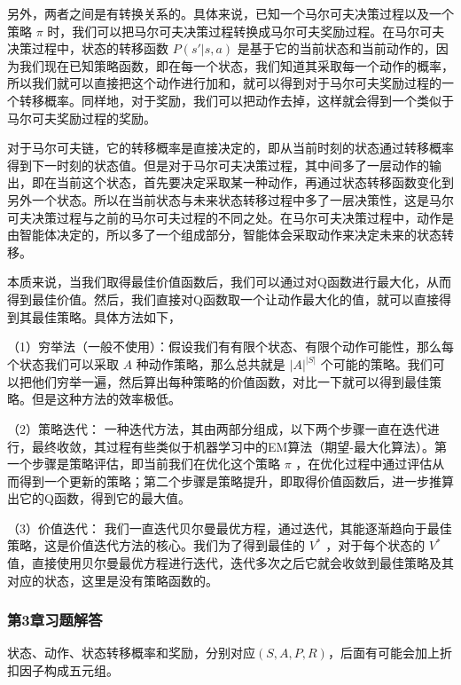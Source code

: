 另外，两者之间是有转换关系的。具体来说，已知一个马尔可夫决策过程以及一个策略 $\pi$ 时，我们可以把马尔可夫决策过程转换成马尔可夫奖励过程。在马尔可夫决策过程中，状态的转移函数 $P(s'|s,a)$ 是基于它的当前状态和当前动作的，因为我们现在已知策略函数，即在每一个状态，我们知道其采取每一个动作的概率，所以我们就可以直接把这个动作进行加和，就可以得到对于马尔可夫奖励过程的一个转移概率。同样地，对于奖励，我们可以把动作去掉，这样就会得到一个类似于马尔可夫奖励过程的奖励。

  
对于马尔可夫链，它的转移概率是直接决定的，即从当前时刻的状态通过转移概率得到下一时刻的状态值。但是对于马尔可夫决策过程，其中间多了一层动作的输出，即在当前这个状态，首先要决定采取某一种动作，再通过状态转移函数变化到另外一个状态。所以在当前状态与未来状态转移过程中多了一层决策性，这是马尔可夫决策过程与之前的马尔可夫过程的不同之处。在马尔可夫决策过程中，动作是由智能体决定的，所以多了一个组成部分，智能体会采取动作来决定未来的状态转移。

  
本质来说，当我们取得最佳价值函数后，我们可以通过对Q函数进行最大化，从而得到最佳价值。然后，我们直接对Q函数取一个让动作最大化的值，就可以直接得到其最佳策略。具体方法如下，

（1）穷举法（一般不使用）：假设我们有有限个状态、有限个动作可能性，那么每个状态我们可以采取 $A$ 种动作策略，那么总共就是 $|A|^{|S|}$ 个可能的策略。我们可以把他们穷举一遍，然后算出每种策略的价值函数，对比一下就可以得到最佳策略。但是这种方法的效率极低。

（2）策略迭代： 一种迭代方法，其由两部分组成，以下两个步骤一直在迭代进行，最终收敛，其过程有些类似于机器学习中的EM算法（期望-最大化算法）。第一个步骤是策略评估，即当前我们在优化这个策略 $\pi$ ，在优化过程中通过评估从而得到一个更新的策略；第二个步骤是策略提升，即取得价值函数后，进一步推算出它的Q函数，得到它的最大值。

（3）价值迭代： 我们一直迭代贝尔曼最优方程，通过迭代，其能逐渐趋向于最佳策略，这是价值迭代方法的核心。我们为了得到最佳的 $V^*$ ，对于每个状态的 $V^*$ 值，直接使用贝尔曼最优方程进行迭代，迭代多次之后它就会收敛到最佳策略及其对应的状态，这里是没有策略函数的。



\subsubsection*{第3章习题解答}


状态、动作、状态转移概率和奖励，分别对应$(S,A,P,R)$，后面有可能会加上折扣因子构成五元组。

